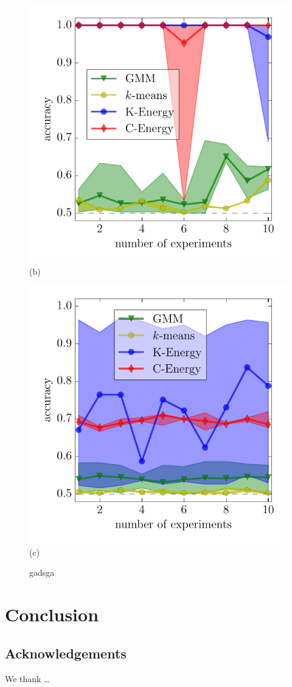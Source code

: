 \documentclass{article}
\begin{document}
\begin{figure}
\begin{minipage}{0.33\textwidth}
\centering
\includegraphics[width=\textwidth]{circles.pdf}\\[-.8em]
(b)
\end{minipage}
\begin{minipage}{0.33\textwidth}
\centering
\includegraphics[width=\textwidth]{spirals.pdf}\\[-.8em]
(c)
\end{minipage}
\caption{
\label{fig:dimension}
gadsga
}
\end{figure}


\section{Conclusion}


\subsection*{Acknowledgements}
We thank \ldots




\end{document}
